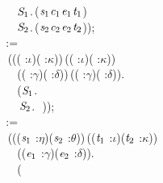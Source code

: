 \,\,\,\,\,\,\,\,\,\,\,\,\,\,\,\,\ensuremath{\HOLFreeVar{S}\sb{\mathrm{1}}}.\,(\ensuremath{\HOLBoundVar{s}\sb{\mathrm{1}}}\HOLSymConst{,}\ensuremath{\HOLBoundVar{c}\sb{\mathrm{1}}}\HOLSymConst{,}\ensuremath{\HOLBoundVar{e}\sb{\mathrm{1}}}\HOLSymConst{,}\ensuremath{\HOLBoundVar{t}\sb{\mathrm{1}}})\,\HOLSymConst{\HOLTokenConj{}}\\
\,\,\,\,\,\,\,\,\,\,\,\,\,\,\,\,\ensuremath{\HOLFreeVar{S}\sb{\mathrm{2}}}.\,(\ensuremath{\HOLBoundVar{s}\sb{\mathrm{2}}}\HOLSymConst{,}\ensuremath{\HOLBoundVar{c}\sb{\mathrm{2}}}\HOLSymConst{,}\ensuremath{\HOLBoundVar{e}\sb{\mathrm{2}}}\HOLSymConst{,}\ensuremath{\HOLBoundVar{t}\sb{\mathrm{2}}}));\\
\,\,\,\,\,\,\,\,\,\,:=\\
\,\,\,\,\,\,\,\,\,\,\,(\HOLTokenLambda{}(( :\ensuremath{\iota})\HOLSymConst{,}( :\ensuremath{\kappa}))\,(( :\ensuremath{\iota})\HOLSymConst{,}( :\ensuremath{\kappa}))\\
\,\,\,\,\,\,\,\,\,\,\,\,\,\,\,\,(( :\ensuremath{\gamma})\HOLSymConst{,}( :\ensuremath{\delta}))\,(( :\ensuremath{\gamma})\HOLSymConst{,}( :\ensuremath{\delta})).\\
\,\,\,\,\,\,\,\,\,\,\,\,\,\,\,\,(\ensuremath{\HOLFreeVar{S}\sb{\mathrm{1}}}.\,\,\,\,\HOLSymConst{,}\\
\,\,\,\,\,\,\,\,\,\,\,\,\,\,\,\,\,\ensuremath{\HOLFreeVar{S}\sb{\mathrm{2}}}.\,\,\,\,));\\
\,\,\,\,\,\,\,\,\,\,:=\\
\,\,\,\,\,\,\,\,\,\,\,(\HOLTokenLambda{}((\ensuremath{\HOLBoundVar{s}\sb{\mathrm{1}}} :\ensuremath{\eta})\HOLSymConst{,}(\ensuremath{\HOLBoundVar{s}\sb{\mathrm{2}}} :\ensuremath{\theta}))\,((\ensuremath{\HOLBoundVar{t}\sb{\mathrm{1}}} :\ensuremath{\iota})\HOLSymConst{,}(\ensuremath{\HOLBoundVar{t}\sb{\mathrm{2}}} :\ensuremath{\kappa}))\\
\,\,\,\,\,\,\,\,\,\,\,\,\,\,\,\,((\ensuremath{\HOLBoundVar{e}\sb{\mathrm{1}}} :\ensuremath{\gamma})\HOLSymConst{,}(\ensuremath{\HOLBoundVar{e}\sb{\mathrm{2}}} :\ensuremath{\delta})).\\
\,\,\,\,\,\,\,\,\,\,\,\,\,\,\,\,(\\
